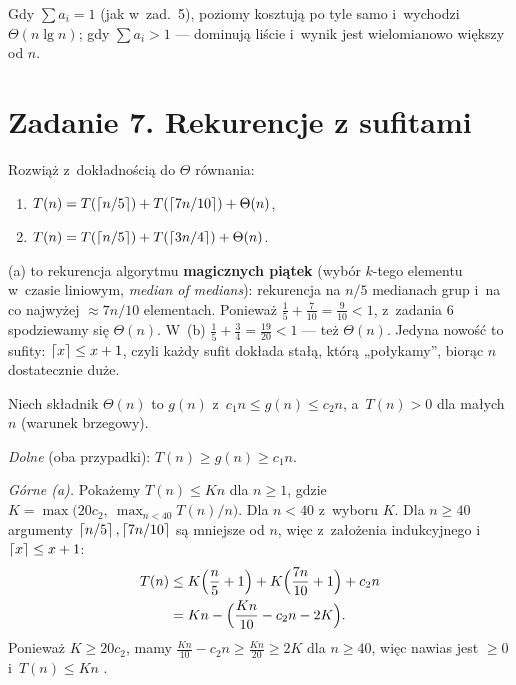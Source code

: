 \documentclass[11pt]{article}
\begin{document}
\begin{uwaga}
Gdy $\sum a_i=1$ (jak w~zad.~5), poziomy kosztują po tyle samo i~wychodzi
$\Theta(n\lg n)$; gdy $\sum a_i>1$ --- dominują liście i~wynik jest
wielomianowo większy od $n$.
\end{uwaga}

\section{Zadanie 7. Rekurencje z sufitami}
\begin{tresc}
Rozwiąż z~dokładnością do $\Theta$ równania:
\begin{enumerate}[label=(\alph*)]
\item $T(n)=T(\left\lceil n/5 \right\rceil)+T(\left\lceil 7n/10 \right\rceil)+\Theta(n)$,
\item $T(n)=T(\left\lceil n/5 \right\rceil)+T(\left\lceil 3n/4 \right\rceil)+\Theta(n)$.
\end{enumerate}
\end{tresc}

\begin{intuicja}
(a) to rekurencja algorytmu \textbf{magicznych piątek} (wybór $k$-tego
elementu w~czasie liniowym, \emph{median of medians}): rekurencja na
$n/5$ medianach grup i~na co najwyżej $\approx7n/10$ elementach. Ponieważ
$\frac15+\frac7{10}=\frac9{10}<1$, z~zadania 6 spodziewamy się $\Theta(n)$.
W~(b) $\frac15+\frac34=\frac{19}{20}<1$ --- też $\Theta(n)$. Jedyna nowość to
sufity: $\left\lceil x \right\rceil\le x+1$, czyli każdy sufit dokłada stałą, którą
„połykamy”, biorąc $n$ dostatecznie duże.
\end{intuicja}
\formalnie
Niech składnik $\Theta(n)$ to $g(n)$ z~$c_1n\le g(n)\le c_2n$, a~$T(n)>0$
dla małych $n$ (warunek brzegowy).

\emph{Dolne} (oba przypadki): $T(n)\ge g(n)\ge c_1n$.

\emph{Górne (a).} Pokażemy $T(n)\le Kn$ dla $n\ge1$, gdzie
$K=\max\bigl(20c_2,\ \max_{n<40}T(n)/n\bigr)$. Dla $n<40$ z~wyboru $K$.
Dla $n\ge40$ argumenty $\left\lceil n/5 \right\rceil,\left\lceil 7n/10 \right\rceil$ są mniejsze od $n$, więc
z~założenia indukcyjnego i~$\left\lceil x \right\rceil\le x+1$:
\begin{align*}
T(n)&\le K\Bigl(\frac n5+1\Bigr)+K\Bigl(\frac{7n}{10}+1\Bigr)+c_2n\\
&=Kn-\Bigl(\frac{Kn}{10}-c_2n-2K\Bigr).
\end{align*}
Ponieważ $K\ge20c_2$, mamy $\frac{Kn}{10}-c_2n\ge\frac{Kn}{20}\ge2K$ dla $n\ge40$, więc nawias
jest $\ge0$ i~$T(n)\le Kn$ \checkmark.
\end{document}
